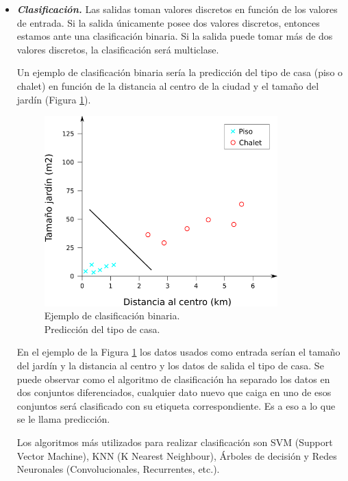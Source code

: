 \begin{itemize}
\item \textit{\textbf{Clasificación.}} Las salidas toman valores discretos en función de los valores de entrada. Si la salida únicamente posee dos valores discretos, entonces estamos ante una clasificación binaria. Si la salida puede tomar más de dos valores discretos, la clasificación será multiclase.

Un ejemplo de clasificación binaria sería la predicción del tipo de casa (piso o chalet) en función de la distancia al centro de la ciudad y el tamaño del jardín (Figura \ref{fig:ejemplo_clasificacion_binaria}).

\begin{figure} [h!]
  \begin{center}
    \includegraphics[width=9cm]{figs/ejemplo_clasificacion_binaria.png}
  \end{center}
  \caption{Ejemplo de clasificación binaria.\\
  Predicción del tipo de casa.}
  \label{fig:ejemplo_clasificacion_binaria}
\end{figure}

En el ejemplo de la Figura \ref{fig:ejemplo_clasificacion_binaria} los datos usados como entrada serían el tamaño del jardín y la distancia al centro y los datos de salida el tipo de casa. Se puede observar como el algoritmo de clasificación ha separado los datos en dos conjuntos diferenciados, cualquier dato nuevo que caiga en uno de esos conjuntos será clasificado con su etiqueta correspondiente. Es a eso a lo que se le llama predicción.

Los algoritmos más utilizados para realizar clasificación son SVM (Support Vector Machine), KNN (K Nearest Neighbour), Árboles de decisión y Redes Neuronales (Convolucionales, Recurrentes, etc.).

\end{itemize}

